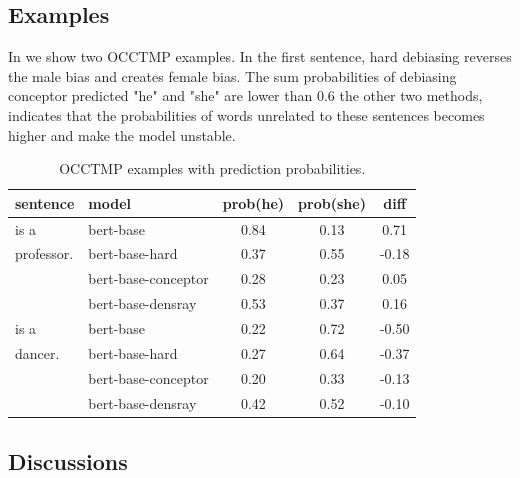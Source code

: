 \subsection{Examples}
In  we show two OCCTMP examples. In the first sentence, hard debiasing reverses the male bias and creates female bias. The sum probabilities of debiasing conceptor predicted "he" and "she" are lower than 0.6 the other two methods, indicates that the probabilities of words unrelated to these sentences becomes higher and make the model unstable.
\begin{table}[h]
	\centering
	\footnotesize
	\begin{tabular}{llccc}
		\hline
		sentence & model & prob(he) & prob(she) &diff\\
		\hline
		[MASK] is a & bert-base & 0.84 & 0.13&0.71\\
		professor.& bert-base-hard& 0.37 & 0.55&-0.18\\
		& bert-base-conceptor& 0.28 & 0.23&0.05\\
		& bert-base-densray & 0.53 & 0.37&0.16\\
		\hline
		[MASK] is a & bert-base & 0.22 & 0.72&-0.50\\
		dancer.  & bert-base-hard& 0.27 & 0.64&-0.37\\
		& bert-base-conceptor& 0.20 & 0.33&-0.13\\
		& bert-base-densray& 0.42 & 0.52&-0.10\\
		\hline
	\end{tabular}
	\caption{
		OCCTMP examples with prediction probabilities.}
\end{table}


\subsection{Discussions}

